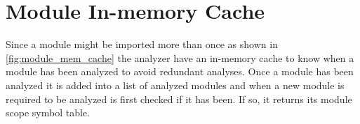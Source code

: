 \section{Module In-memory Cache}

Since a module might be imported more than once as shown in \autoref{fig:module_mem_cache} the analyzer
have an in-memory cache to know when a module has been analyzed to avoid redundant analyses.
Once a module has been analyzed it is added into a list of analyzed modules and when a new module is required to be
analyzed is first checked if it has been. If so, it returns its module scope symbol table.
